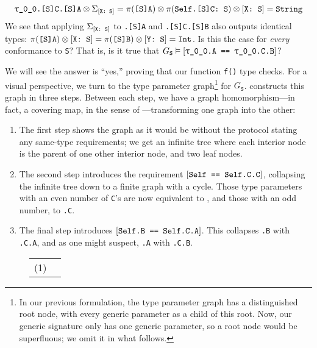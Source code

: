 \documentclass[../generics]{subfiles}
\begin{document}
\begin{example}
\begin{gather*}
\texttt{\ttgp{0}{0}.[S]C.[S]A}\otimes\Sigma_{\ConfReq{X}{S}}=\AssocType{[S]A}\otimes\AssocConf{Self.[S]C}{S}\otimes\ConfReq{X}{S}=\texttt{String}
\end{gather*}
We see that applying $\Sigma_{[\texttt{X:~S}]}$ to \texttt{.[S]A} and \texttt{.[S]C.[S]B} also outputs identical types: $\pi(\texttt{[S]A})\otimes[\texttt{X:~S}]=\pi(\texttt{[S]B})\otimes[\texttt{Y:~S}]=\texttt{Int}$. Is this the case for \emph{every} conformance to \texttt{S}? That is, is it true that $G_\texttt{S}\vDash\SameReq{\texttt{\ttgp{0}{0}.A}}{\texttt{\ttgp{0}{0}.C.B}}$?

We will see the answer is ``yes,'' proving that our function \texttt{f()} type checks. For a visual perspective, we turn to the type parameter graph\footnote{In our previous formulation, the type parameter graph has a distinguished root node, with every generic parameter as a child of this root. Now, our generic signature only has one generic parameter, so a root node would be superfluous; we omit it in what follows.} for $G_\texttt{S}$.  constructs this graph in three steps. Between each step, we have a graph homomorphism---in fact, a covering map, in the sense of ---transforming one graph into the other:
\begin{enumerate}
\item The first step shows the graph as it would be without the protocol stating any same-type requirements; we get an infinite tree where each interior node is the parent of one other interior node, and two leaf nodes.

\item The second step introduces the requirement $[\texttt{Self == Self.C.C}]$, collapsing the infinite tree down to a finite graph with a cycle. Those type parameters with an even number of \texttt{C}'s are now equivalent to \texttt{}, and those with an odd number, to \texttt{.C}.

\item The final step introduces $[\texttt{Self.B == Self.C.A}]$. This collapses \texttt{.B} with \texttt{.C.A}, and as one might suspect, \texttt{.A} with \texttt{.C.B}.
\end{enumerate}

\begin{figure}\label{protocol s fig}
\begin{center}
\begin{tabular}{lc}
\toprule
(1) &
\begin{tikzpicture}


\end{tikzpicture}
\end{tabular}
\end{center}
\end{figure}
\end{example}
\end{document}
